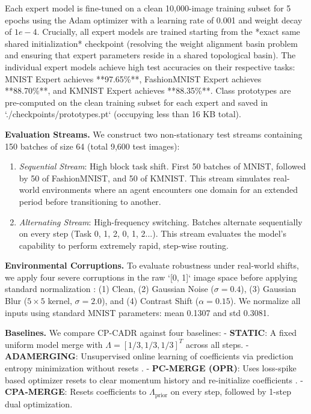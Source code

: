 \documentclass{article}
\theoremstyle{plain}
\theoremstyle{definition}
\theoremstyle{remark}
\begin{document}
Each expert model is fine-tuned on a clean 10,000-image training subset for 5 epochs using the Adam optimizer \cite{kingma15} with a learning rate of 0.001 and weight decay of $1e-4$. Crucially, all expert models are trained starting from the *exact same shared initialization* checkpoint (resolving the weight alignment basin problem and ensuring that expert parameters reside in a shared topological basin). The individual expert models achieve high test accuracies on their respective tasks: MNIST Expert achieves **97.65\%**, FashionMNIST Expert achieves **88.70\%**, and KMNIST Expert achieves **88.35\%**. Class prototypes are pre-computed on the clean training subset for each expert and saved in `./checkpoints/prototypes.pt` (occupying less than 16 KB total).

\textbf{Evaluation Streams.} We construct two non-stationary test streams containing 150 batches of size 64 (total 9,600 test images):
\begin{enumerate}
    \item \emph{Sequential Stream}: High block task shift. First 50 batches of MNIST, followed by 50 of FashionMNIST, and 50 of KMNIST. This stream simulates real-world environments where an agent encounters one domain for an extended period before transitioning to another.
    \item \emph{Alternating Stream}: High-frequency switching. Batches alternate sequentially on every step (Task 0, 1, 2, 0, 1, 2...). This stream evaluates the model's capability to perform extremely rapid, step-wise routing.
\end{enumerate}

\textbf{Environmental Corruptions.} To evaluate robustness under real-world shifts, we apply four severe corruptions in the raw `[0, 1]` image space before applying standard normalization \cite{hendrycks19}: (1) Clean, (2) Gaussian Noise ($\sigma = 0.4$), (3) Gaussian Blur ($5 \times 5$ kernel, $\sigma = 2.0$), and (4) Contrast Shift ($\alpha = 0.15$). We normalize all inputs using standard MNIST parameters: mean 0.1307 and std 0.3081.

\textbf{Baselines.} We compare CP-CADR against four baselines:
- \textbf{STATIC}: A fixed uniform model merge with $\Lambda = [1/3, 1/3, 1/3]^T$ across all steps.
- \textbf{ADAMERGING}: Unsupervised online learning of coefficients via prediction entropy minimization without resets \cite{yang24}.
- \textbf{PC-MERGE (OPR)}: Uses loss-spike based optimizer resets to clear momentum history and re-initialize coefficients \cite{choi24}.
- \textbf{CPA-MERGE}: Resets coefficients to $\Lambda_{\text{prior}}$ on every step, followed by 1-step dual optimization.
\end{document}
